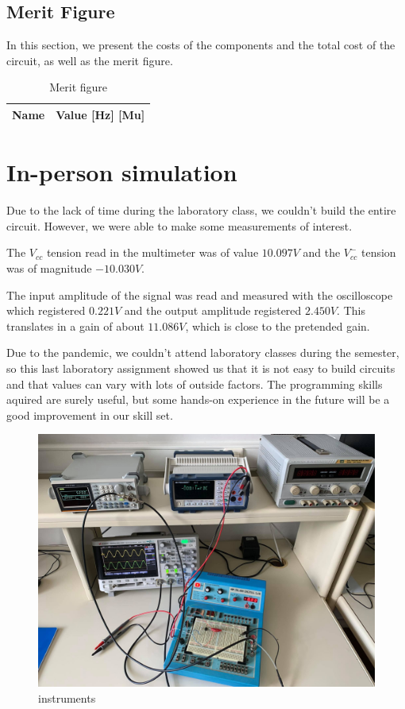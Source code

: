 \subsection{Merit Figure}
In this section, we present the costs of the components and the total cost of the circuit, as well as the merit figure.

 \begin{table}[h]
  \centering
  \begin{tabular}{|l|r|}
    \hline    
    {\bf Name} & {\bf Value [Hz] [Mu]} \\ \hline
    
  \end{tabular}
  \caption{Merit figure}
  \label{tab:data3sim_sim}
\end{table}
\FloatBarrier

\section{In-person simulation}
\label{sec:irl}

Due to the lack of time during the laboratory class, we couldn't build the entire circuit. However, we were able to make some measurements of interest. \par
The $V_{cc}$ tension read in the multimeter was of value $10.097 V$ and the $V_{cc}^-$ tension was of magnitude $-10.030 V$. \par
The input amplitude of the signal was read and measured with the oscilloscope which registered $0.221 V$ and the output amplitude registered $2.450 V$. This translates in a gain of about $11.086V$, which is close to the pretended gain. \par
Due to the pandemic, we couldn't attend laboratory classes during the semester, so this last laboratory assignment showed us that it is not easy to build circuits and that values can vary with lots of outside factors. The programming skills aquired are surely useful, but some hands-on experience in the future will be a good improvement in our skill set.  


\begin{figure}[h]
\centering
  \centering
  \includegraphics[scale=0.1]{in-person.jpg}
  \caption{instruments}
  \label{fig:1}
\end{figure}

